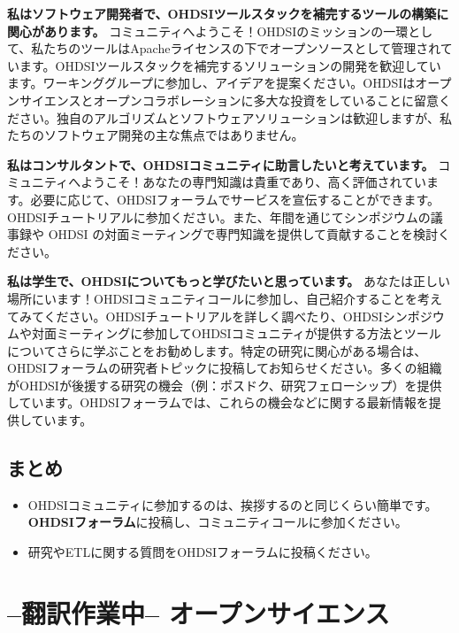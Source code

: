 \documentclass[
  11pt]{book}
\makeatletter
\providecommand{\tightlist}{%
  \setlength{\itemsep}{0pt}\setlength{\parskip}{0pt}}
\newenvironment{kframe}{%
\medskip{}
\setlength{\fboxsep}{.8em}
 \def\at@end@of@kframe{}%
 \ifinner\ifhmode%
  \def\at@end@of@kframe{\end{minipage}}%
  \begin{minipage}{\columnwidth}%
 \fi\fi%
 \def\FrameCommand##1{\hskip\@totalleftmargin \hskip-\fboxsep
 \colorbox{myShadeColor}{##1}\hskip-\fboxsep
     \hskip-\linewidth \hskip-\@totalleftmargin \hskip\columnwidth}%
 \MakeFramed {\advance\hsize-\width
   \@totalleftmargin\z@ \linewidth\hsize
   \@setminipage}}%
 {\par\unskip\endMakeFramed%
 \at@end@of@kframe}
\newenvironment{rmdblock}[1]
  {
  \begin{itemize}
  \renewcommand{\labelitemi}{
    \raisebox{-.7\height}[0pt][0pt]{
      {\setkeys{Gin}{width=3em,keepaspectratio}\texttt{[image: images/\#1]}}
    }
  }
  \setlength{\fboxsep}{1em}
  \begin{kframe}
  \item
  }
  {
  \end{kframe}
  \end{itemize}
  }
\newenvironment{rmdsummary}
  {\begin{rmdblock}{summary}}
  {\end{rmdblock}}
\theoremstyle{definition}
\theoremstyle{definition}
\theoremstyle{definition}
\theoremstyle{definition}
\theoremstyle{remark}
\makeatother
\begin{document}
\textbf{私はソフトウェア開発者で、OHDSIツールスタックを補完するツールの構築に関心があります。} コミュニティへようこそ！OHDSIのミッションの一環として、私たちのツールはApacheライセンスの下でオープンソースとして管理されています。OHDSIツールスタックを補完するソリューションの開発を歓迎しています。ワーキンググループに参加し、アイデアを提案ください。OHDSIはオープンサイエンスとオープンコラボレーションに多大な投資をしていることに留意ください。独自のアルゴリズムとソフトウェアソリューションは歓迎しますが、私たちのソフトウェア開発の主な焦点ではありません。

\textbf{私はコンサルタントで、OHDSIコミュニティに助言したいと考えています。} コミュニティへようこそ！あなたの専門知識は貴重であり、高く評価されています。必要に応じて、OHDSIフォーラムでサービスを宣伝することができます。OHDSIチュートリアルに参加ください。また、年間を通じてシンポジウムの議事録や OHDSI の対面ミーティングで専門知識を提供して貢献することを検討ください。

\textbf{私は学生で、OHDSIについてもっと学びたいと思っています。} あなたは正しい場所にいます！OHDSIコミュニティコールに参加し、自己紹介することを考えてみてください。OHDSIチュートリアルを詳しく調べたり、OHDSIシンポジウムや対面ミーティングに参加してOHDSIコミュニティが提供する方法とツールについてさらに学ぶことをお勧めします。特定の研究に関心がある場合は、OHDSIフォーラムの研究者トピックに投稿してお知らせください。多くの組織がOHDSIが後援する研究の機会（例：ポスドク、研究フェローシップ）を提供しています。OHDSIフォーラムでは、これらの機会などに関する最新情報を提供しています。

\section{まとめ}\label{ux307eux3068ux3081-1}

\begin{rmdsummary}
\begin{itemize}
\tightlist
\item
  OHDSIコミュニティに参加するのは、挨拶するのと同じくらい簡単です。\textbf{OHDSIフォーラム}に投稿し、コミュニティコールに参加ください。
\item
  研究やETLに関する質問をOHDSIフォーラムに投稿ください。
\end{itemize}
\end{rmdsummary}

\chapter{--翻訳作業中-- オープンサイエンス}\label{OpenScience}
\end{document}
